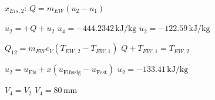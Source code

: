 \( x_{Eis,2} \):  
\( Q = m_{EW} (u_2 - u_1) \)  

\( u_2 = + Q + u_2 \)  
\( u_4 = -444.2342 \, \text{kJ/kg} \)  
\( u_2 = -122.59 \, \text{kJ/kg} \)  

\( Q_{12} = m_{EW} c_V (T_{EW,2} - T_{EW,1}) \)  
\( Q + T_{EW,1} = T_{EW,2} \)  

\( u_2 = u_{\text{Eis}} + x (u_{\text{Flüssig}} - u_{\text{Fest}}) \)  
\( u_2 = -133.41 \, \text{kJ/kg} \)  

\( V_4 = V_2 \)  
\( V_4 = 80 \, \text{mm} \)